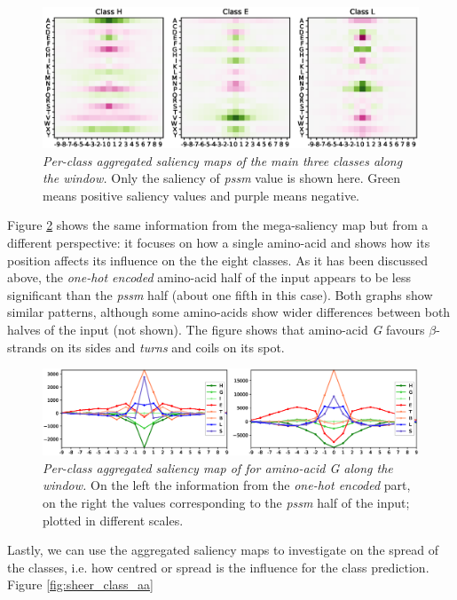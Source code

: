 		\begin{figure}
			\centering
			\includegraphics[width=1\linewidth]{Figures/class_agg_class}
			\caption{\textit{Per-class aggregated saliency maps of the main three classes along the window.} Only the saliency of \textit{pssm} value is shown here. Green means positive saliency values and purple means negative.}
			\label{fig:class_agg_class}
		\end{figure}
		
		Figure \ref{fig:class_agg_aa} shows the same information from the mega-saliency map but from a different perspective: it focuses on how a single amino-acid and shows how its position affects its influence on the the eight classes. As it has been discussed above, the \textit{one-hot encoded} amino-acid half of the input appears to be less significant than the \textit{pssm} half (about one fifth in this case). Both graphs show similar patterns, although some amino-acids show wider differences between both halves of the input (not shown). The figure shows that amino-acid \textit{G} favours $\beta$-strands on its sides and \textit{turns} and coils on its spot. 
		
		\begin{figure}
			\centering
			\includegraphics[width=1\linewidth]{Figures/class_agg_aa}
			\caption{\textit{Per-class aggregated saliency map of for amino-acid G along the window.} On the left the information from the \textit{one-hot encoded} part, on the right the values corresponding to the \textit{pssm} half of the input; plotted in different scales.}
			\label{fig:class_agg_aa}
		\end{figure}
		
		Lastly, we can use the aggregated saliency maps to investigate on the spread of the classes, i.e. how centred or spread is the influence for the class prediction.
		Figure \ref{fig:sheer_class_aa}

